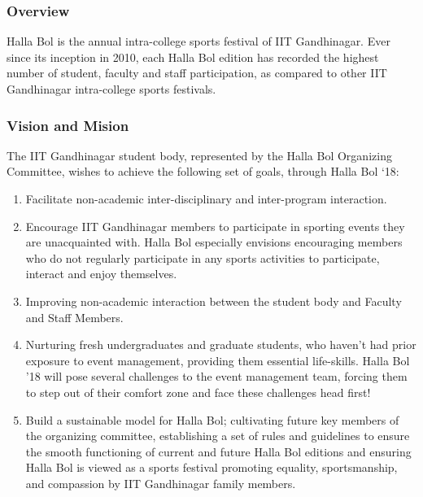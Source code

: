 \documentclass[12pt]{article}
\begin{document}
\subsubsection{Overview}
Halla Bol is the annual intra-college sports festival of IIT Gandhinagar. Ever since its inception in 2010, each Halla Bol edition has recorded the highest number of student, faculty and staff participation, as compared to other IIT Gandhinagar intra-college sports festivals. 

\subsubsection{Vision and Mision}
The IIT Gandhinagar student body, represented by the Halla Bol Organizing Committee, wishes to achieve the following set of goals, through Halla Bol ‘18:
\begin{enumerate}
    \item Facilitate non-academic inter-disciplinary and inter-program interaction.
    \item Encourage IIT Gandhinagar members to participate in sporting events they are unacquainted with. Halla Bol especially envisions encouraging members who do not regularly participate in any sports activities to participate, interact and enjoy themselves.
    \item Improving non-academic interaction between the student body and Faculty and Staff Members.
    \item Nurturing fresh undergraduates and graduate students, who haven’t had prior exposure to event management, providing them essential life-skills. Halla Bol ’18 will pose several challenges to the event management team, forcing them to step out of their comfort zone and face these challenges head first!
    \item Build a sustainable model for Halla Bol; cultivating future key members of the organizing committee, establishing a set of rules and guidelines to ensure the smooth functioning of current and future Halla Bol editions and ensuring Halla Bol is viewed as a sports festival promoting equality, sportsmanship, and compassion by IIT Gandhinagar family members.
\end{enumerate}
\end{document}
